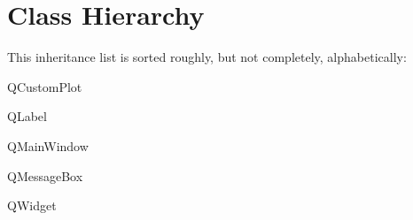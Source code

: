 \section{Class Hierarchy}
This inheritance list is sorted roughly, but not completely, alphabetically\+:\begin{DoxyCompactList}
\item Q\+Custom\+Plot\begin{DoxyCompactList}
\item {}
\end{DoxyCompactList}
\item Q\+Label\begin{DoxyCompactList}
\item {}
\end{DoxyCompactList}
\item Q\+Main\+Window\begin{DoxyCompactList}
\item {}
\end{DoxyCompactList}
\item Q\+Message\+Box\begin{DoxyCompactList}
\item {}
\end{DoxyCompactList}
\item Q\+Widget\begin{DoxyCompactList}
\item {}
\end{DoxyCompactList}
\end{DoxyCompactList}
